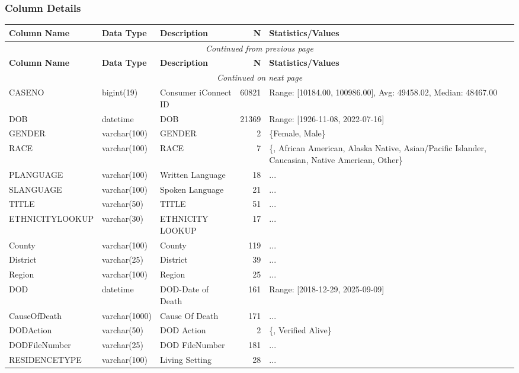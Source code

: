 \begin{landscape}
\subsubsection{Column Details}
\begin{longtable}{|l|l|l|r|p{6cm}|}
\hline
\textbf{Column Name} & \textbf{Data Type} & \textbf{Description} & \textbf{N} & \textbf{Statistics/Values} \\
\hline
\endfirsthead
\multicolumn{5}{c}{\textit{Continued from previous page}} \\
\hline
\textbf{Column Name} & \textbf{Data Type} & \textbf{Description} & \textbf{N} & \textbf{Statistics/Values} \\
\hline
\endhead
\hline
\multicolumn{5}{c}{\textit{Continued on next page}} \\
\endfoot
\hline
\endlastfoot
CASENO & bigint(19) & Consumer iConnect ID & 60821 & Range: [10184.00, 100986.00], Avg: 49458.02, Median: 48467.00 \\
\hline
DOB & datetime & DOB & 21369 & Range: [1926-11-08, 2022-07-16] \\
\hline
GENDER & varchar(100) & GENDER & 2 & \{Female, Male\} \\
\hline
RACE & varchar(100) & RACE & 7 & \{, African American, Alaska Native, Asian/Pacific Islander, Caucasian, Native American, Other\} \\
\hline
PLANGUAGE & varchar(100) & Written Language & 18 & ... \\
\hline
SLANGUAGE & varchar(100) & Spoken Language & 21 & ... \\
\hline
TITLE & varchar(50) & TITLE & 51 & ... \\
\hline
ETHNICITYLOOKUP & varchar(30) & ETHNICITY LOOKUP & 17 & ... \\
\hline
County & varchar(100) & County & 119 & ... \\
\hline
District & varchar(25) & District & 39 & ... \\
\hline
Region & varchar(100) & Region & 25 & ... \\
\hline
DOD & datetime & DOD-Date of Death & 161 & Range: [2018-12-29, 2025-09-09] \\
\hline
CauseOfDeath & varchar(1000) & Cause Of Death & 171 & ... \\
\hline
DODAction & varchar(50) & DOD Action & 2 & \{, Verified Alive\} \\
\hline
DODFileNumber & varchar(25) & DOD FileNumber & 181 & ... \\
\hline
RESIDENCETYPE & varchar(100) & Living Setting & 28 & ... \\

\end{longtable}
\end{landscape}
